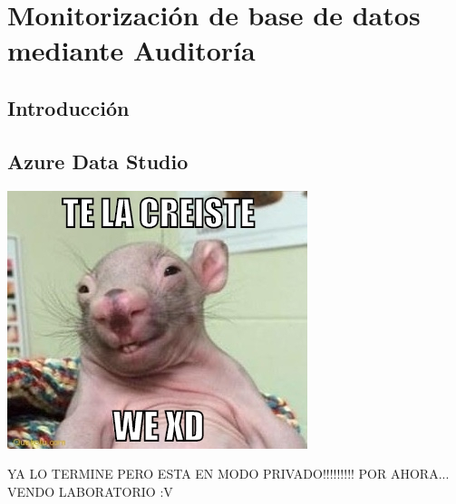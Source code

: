 \section{Monitorización de base de datos mediante Auditoría} 

\subsection{Introducción}



\subsection{Azure Data Studio}



\begin{center}
    \includegraphics{./Imagenes/ddd}
    \end{center}
    
    	YA LO TERMINE PERO ESTA EN MODO PRIVADO!!!!!!!!! POR AHORA... VENDO LABORATORIO :V
